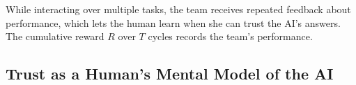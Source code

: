 \documentclass[letterpaper]{article} %
\newcommand{\?}{\mbox{?}}
\begin{document}
\noindent While interacting over multiple tasks, the team receives repeated feedback about performance, which lets the human learn when she can trust the AI's answers. The cumulative reward $R$ over $T$ cycles records the team's performance.



\subsection{Trust as a Human's Mental Model of the AI}

\end{document}
